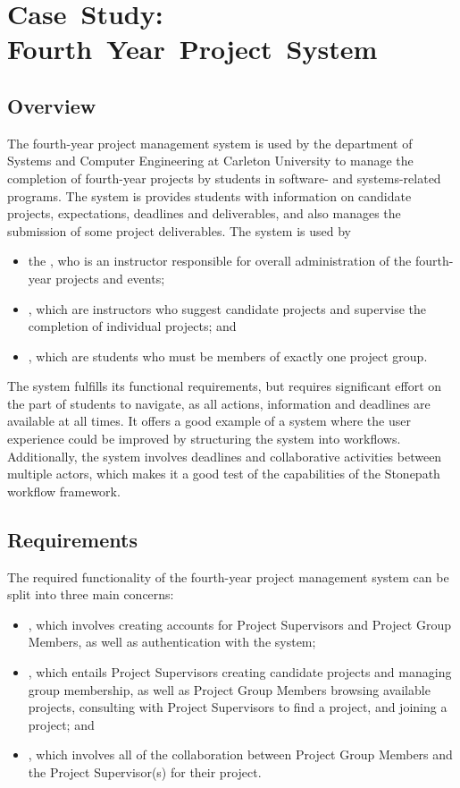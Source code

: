 \chapter{Case~Study: Fourth~Year~Project~System}


\section {Overview}

The fourth-year project management system is used by the department of Systems and Computer Engineering at Carleton University to manage the completion of fourth-year projects by students in software- and systems-related programs. The system is provides students with information on candidate projects, expectations, deadlines and deliverables, and also manages the submission of some project deliverables. The system is used by
\begin{itemize}
\item the , who is an instructor responsible for overall administration of the fourth-year projects and events;
\item {}, which are instructors who suggest candidate projects and supervise the completion of individual projects; and
\item {}, which are students who must be members of exactly one project group.
\end{itemize}

The system fulfills its functional requirements, but requires significant effort on the part of students to navigate, as all actions, information and deadlines are available at all times. It offers a good example of a system where the user experience could be improved by structuring the system into workflows. Additionally, the system involves deadlines and collaborative activities between multiple actors, which makes it a good test of the capabilities of the Stonepath workflow framework.

\section {Requirements}
The required functionality of the fourth-year project management system can be split into three main concerns:
\begin{itemize}
\item {}, which involves creating accounts for Project Supervisors and Project Group Members, as well as authentication with the system;
\item {}, which entails Project Supervisors creating candidate projects and managing group membership, as well as Project Group Members browsing available projects, consulting with Project Supervisors to find a project, and joining a project; and
\item {}, which involves all of the collaboration between Project Group Members and the Project Supervisor(s) for their project.
\end{itemize}

